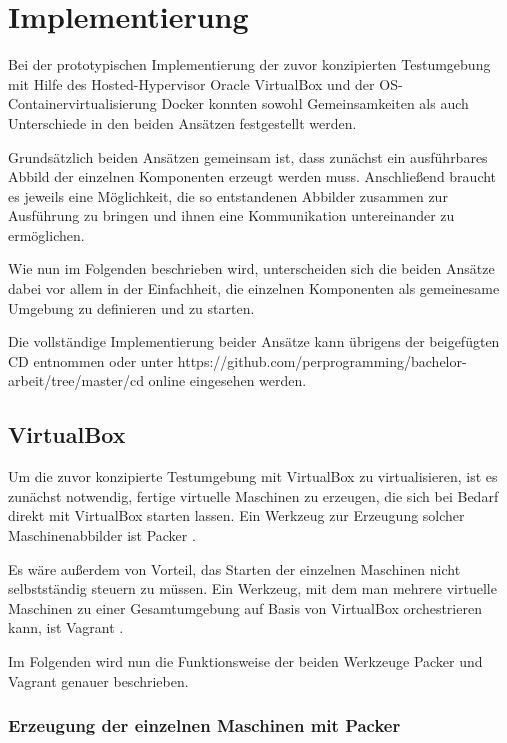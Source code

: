 \section{Implementierung}

Bei der prototypischen Implementierung der zuvor konzipierten Testumgebung mit Hilfe des Hosted-Hypervisor Oracle VirtualBox und der OS-Containervirtualisierung Docker konnten sowohl Gemeinsamkeiten als auch Unterschiede in den beiden Ansätzen festgestellt werden.

Grundsätzlich beiden Ansätzen gemeinsam ist, dass zunächst ein ausführbares Abbild der einzelnen Komponenten erzeugt werden muss. Anschließend braucht es jeweils eine Möglichkeit, die so entstandenen Abbilder zusammen zur Ausführung zu bringen und ihnen eine Kommunikation untereinander zu ermöglichen.

Wie nun im Folgenden beschrieben wird, unterscheiden sich die beiden Ansätze dabei vor allem in der Einfachheit, die einzelnen Komponenten als gemeinesame Umgebung zu definieren und zu starten.

Die vollständige Implementierung beider Ansätze kann übrigens der beigefügten CD entnommen oder unter https://github.com/perprogramming/bachelor-arbeit/tree/master/cd online eingesehen werden.

\subsection{VirtualBox}

Um die zuvor konzipierte Testumgebung mit VirtualBox zu virtualisieren, ist es zunächst notwendig, fertige virtuelle Maschinen zu erzeugen, die sich bei Bedarf direkt mit VirtualBox starten lassen. Ein Werkzeug zur Erzeugung solcher Maschinenabbilder ist Packer \citep[Siehe][]{Packer15}.

Es wäre außerdem von Vorteil, das Starten der einzelnen Maschinen nicht selbstständig steuern zu müssen. Ein Werkzeug, mit dem man mehrere virtuelle Maschinen zu einer Gesamtumgebung auf Basis von VirtualBox orchestrieren kann, ist Vagrant \citep[Siehe][]{Vagrant:001}.

Im Folgenden wird nun die Funktionsweise der beiden Werkzeuge Packer und Vagrant genauer beschrieben.

\subsubsection{Erzeugung der einzelnen Maschinen mit Packer}

